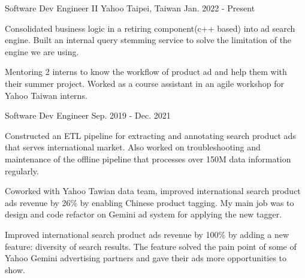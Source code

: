 

\begin{cventries}

  \cventry
    {Software Dev Engineer II} %
    {Yahoo} %
    {Taipei, Taiwan} %
    {Jan. 2022 - Present} %
    {
      \begin{cvitems} %
      \item {Consolidated business logic in a retiring component(c++ based) into ad search engine. Built an internal query stemming service to solve the limitation of the engine we are using.}
        \item {Mentoring 2 interns to know the workflow of product ad and help them with their summer project. Worked as a course assistant in an agile workshop for Yahoo Taiwan interns.}
      \end{cvitems}
    }

  \cventry
    {Software Dev Engineer} %
    {} %
    {} %
    {Sep. 2019 - Dec. 2021} %
    {
      \begin{cvitems} %
        \item {Constructed an ETL pipeline for extracting and annotating search product ads that serves international market. Also worked on troubleshooting and maintenance of the offline pipeline that processes over 150M data information regularly.}
        \item {Coworked with Yahoo Tawian data team, improved international search product ads revenue by 26\% by enabling Chinese product tagging. My main job was to design and code refactor on Gemini ad system for applying the new tagger.}
        \item {Improved international search product ads revenue by 100\% by adding a new feature: diversity of search results. The feature solved the pain point of some of Yahoo Gemini advertising partners and gave their ads more opportunities to show.}
      \end{cvitems}
    }


\end{cventries}
